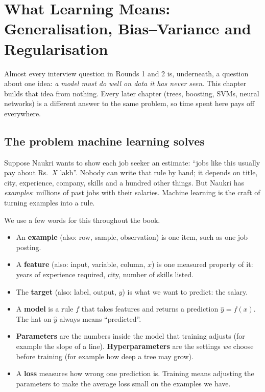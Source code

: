 \chapter{What Learning Means: Generalisation, Bias--Variance and Regularisation}

Almost every interview question in Rounds 1 and 2 is, underneath, a question about one idea:
\emph{a model must do well on data it has never seen}. This chapter builds that idea from nothing.
Every later chapter (trees, boosting, SVMs, neural networks) is a different answer to the same
problem, so time spent here pays off everywhere.

\section{The problem machine learning solves}

Suppose Naukri wants to show each job seeker an estimate: ``jobs like this usually pay about
Rs.~$X$ lakh''. Nobody can write that rule by hand; it depends on title, city, experience, company,
skills and a hundred other things. But Naukri has \emph{examples}: millions of past jobs with their
salaries. Machine learning is the craft of turning examples into a rule.

We use a few words for this throughout the book.
\begin{itemize}
\item An \textbf{example} (also: row, sample, observation) is one item, such as one job posting.
\item A \textbf{feature} (also: input, variable, column, $x$) is one measured property of it: years of
  experience required, city, number of skills listed.
\item The \textbf{target} (also: label, output, $y$) is what we want to predict: the salary.
\item A \textbf{model} is a rule $f$ that takes features and returns a prediction $\hat y = f(x)$.
  The hat on $\hat y$ always means ``predicted''.
\item \textbf{Parameters} are the numbers inside the model that training adjusts (for example the slope of a
  line). \textbf{Hyperparameters} are the settings \emph{we} choose before training (for example how
  deep a tree may grow).
\item A \textbf{loss} measures how wrong one prediction is. Training means adjusting the parameters to
  make the average loss small on the examples we have.
\end{itemize}

